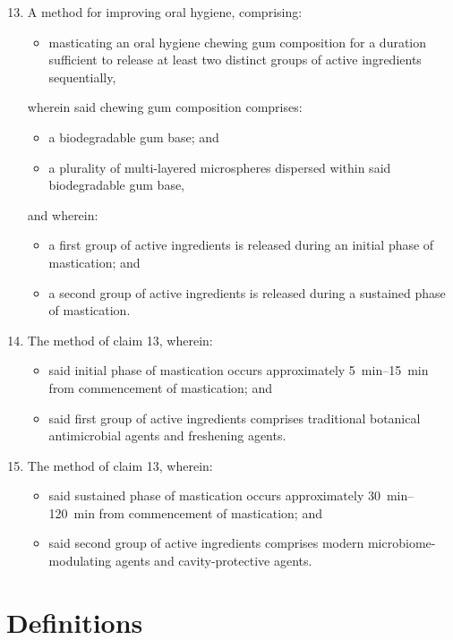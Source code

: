 \documentclass[12pt]{article}
\begin{document}
\begin{enumerate}
    \setcounter{enumi}{12}
    \item A method for improving oral hygiene, comprising:
    \begin{itemize}
        \item masticating an oral hygiene chewing gum composition for a duration sufficient to release at least two distinct groups of active ingredients sequentially,
    \end{itemize}
    wherein said chewing gum composition comprises:
    \begin{itemize}
        \item a biodegradable gum base; and
        \item a plurality of multi-layered microspheres dispersed within said biodegradable gum base,
    \end{itemize}
    and wherein:
    \begin{itemize}
        \item a first group of active ingredients is released during an initial phase of mastication; and
        \item a second group of active ingredients is released during a sustained phase of mastication.
    \end{itemize}

    \item The method of claim 13, wherein:
    \begin{itemize}
        \item said initial phase of mastication occurs approximately \SIrange{5}{15}{\minute} from commencement of mastication; and
        \item said first group of active ingredients comprises traditional botanical antimicrobial agents and freshening agents.
    \end{itemize}

    \item The method of claim 13, wherein:
    \begin{itemize}
        \item said sustained phase of mastication occurs approximately \SIrange{30}{120}{\minute} from commencement of mastication; and
        \item said second group of active ingredients comprises modern microbiome-modulating agents and cavity-protective agents.
    \end{itemize}
\end{enumerate}

\section*{Definitions}
\end{document}
